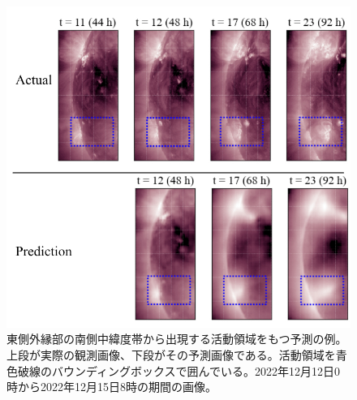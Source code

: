         \begin{figure}[htbp]
          \centering
          \includegraphics[width=\textwidth]{figures/exp1/limb_sample_12_caption.jpg}
          \caption{東側外縁部の南側中緯度帯から出現する活動領域をもつ予測の例。上段が実際の観測画像、下段がその予測画像である。活動領域を青色破線のバウンディングボックスで囲んでいる。2022年12月12日0時から2022年12月15日8時の期間の画像。}
          \label{fig:exp1_limb_example_2}
        \end{figure}

